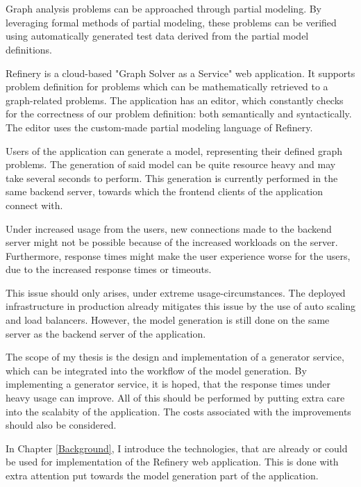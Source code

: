 \chapter{\bevezetes}

Graph analysis problems can be approached through partial modeling. By leveraging
formal methods of partial modeling, these problems can be verified using automatically
generated test data derived from the partial model definitions.

Refinery \cite{refinery} is a cloud-based "Graph Solver as a Service" web application. It supports problem
definition for problems which can be mathematically retrieved to a graph-related problems.
The application has an editor, which constantly checks for the correctness of our problem definition:
both semantically and syntactically. The editor uses the custom-made partial modeling language of Refinery.

Users of the application can generate a model, representing their defined graph problems. The generation of 
said model can be quite resource heavy and may take several seconds to perform. 
This generation is currently performed in the same backend server, towards which the frontend clients of the application
connect with. 

Under increased usage from the users, new connections made to the backend server might not be possible because of 
the increased workloads on the server. Furthermore, response times might make the user experience worse for the users, due to the increased response
times or timeouts.

This issue should only arises, under extreme usage-circumstances. The deployed infrastructure in production already mitigates this issue by 
the use of auto scaling and load balancers. However, the model generation is still done on the same server as the backend server of 
the application.

The scope of my thesis is the design and implementation of a generator service, which can be integrated into the workflow of the model generation.
By implementing a generator service, it is hoped, that the response times under heavy usage can improve. All of this should be performed by 
putting extra care into the scalabity of the application. The costs associated with the improvements should also be considered.

In Chapter \ref{Background}, I introduce the technologies, that are already or could be used for implementation of the Refinery web application.
This is done with extra attention put towards the model generation part of the application.

